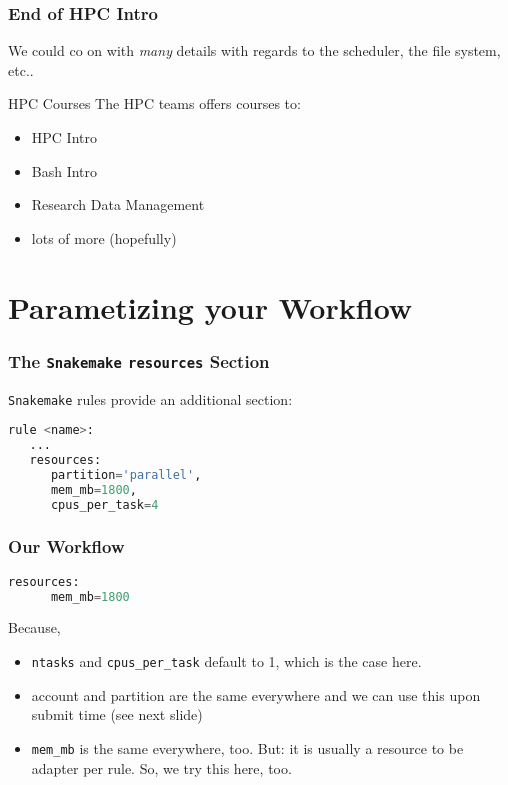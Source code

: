 \begin{frame}
  \frametitle{End of HPC Intro}
  We could co on with \emph{many} details with regards to the scheduler, the file system, etc..
  \begin{block}{HPC Courses}
   The HPC teams offers courses to:
   \begin{itemize}
    \item HPC Intro
    \item Bash Intro
    \item Research Data Management
    \item lots of more (hopefully)
   \end{itemize}
  \end{block}
  \pause
\end{frame}


\section{Parametizing your Workflow}

\begin{frame}[fragile]
  \frametitle{The \texttt{Snakemake} \texttt{resources} Section}
  \texttt{Snakemake} rules provide an additional section:
  \begin{lstlisting}[language=Python,style=Python]
rule <name>:
   ...
   resources:
      partition='parallel',
      mem_mb=1800,
      cpus_per_task=4
  \end{lstlisting}
\end{frame}

\begin{frame}[fragile]
  \frametitle{Our Workflow}
  \begin{lstlisting}[language=Python,style=Python]
   resources:
      mem_mb=1800
  \end{lstlisting}
  \pause
  Because,
  \begin{itemize}
   \item \texttt{ntasks} and \texttt{cpus\_per\_task} default to 1, which is the case here.
   \item account and partition are the same everywhere and we can use this upon submit time (see next slide)
   \item \texttt{mem\_mb} is the same everywhere, too. But: it is usually a resource to be adapter per rule. So, we try this here, too.
  \end{itemize}
\end{frame}

